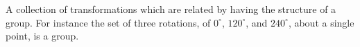A collection of transformations which are related by having the 
structure of a group. For instance the set of three rotations, of 
$0^{\circ}$, $120^{\circ}$, and $240^{\circ}$, about a single point, is a group.